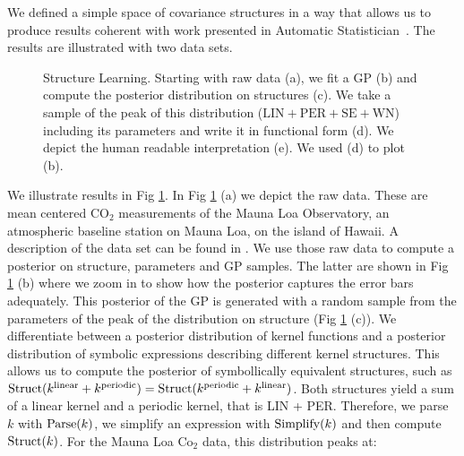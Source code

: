\newpage
We defined a simple space of covariance structures in a way that allows us to produce results coherent with 
work presented in Automatic Statistician~\citep{duvenaud2013structure,lloyd2014automatic}. The results are illustrated with two data sets.

\begin{figure}
\centering

\caption{\footnotesize Structure Learning. Starting with raw data (a), we fit a \ac{GP}
(b) and compute the posterior distribution on structures (c). We take a sample
of the peak of this distribution ($\text{LIN}+\text{PER}+\text{SE}+\text{WN}$)
including its parameters and write it in functional form (d). We depict the
human readable interpretation (e). We used (d) to plot (b).}\label{fig:posterior}
\end{figure}
We illustrate results in Fig \ref{fig:posterior}. In Fig \ref{fig:posterior} (a) we depict the raw data. 
These are mean centered CO$_2$ measurements of the Mauna Loa Observatory, an atmospheric
baseline station on Mauna Loa, on the island of Hawaii. 
A description of the data set  can be found in  \citealp[][chapter 5]{rasmussen2006gaussian}.  
We use those raw data to compute a posterior on structure, parameters and \ac{GP}
samples.
The latter are shown in  Fig \ref{fig:posterior} (b)
where we zoom in to show how the posterior captures the error bars
adequately.
This posterior of the \ac{GP} is generated with a random sample from the parameters
of the peak of the distribution on structure (Fig \ref{fig:posterior} (c)).
We differentiate between a posterior distribution of kernel functions and  a
posterior distribution of
symbolic expressions describing different kernel structures. 
This allows us to compute the posterior of symbollically equivalent structures,
such as $\text{Struct}(k^\text{linear} + k^\text{periodic})=\text{Struct}(k^\text{periodic} + k^\text{linear})$. Both structures yield
a sum of a linear kernel and a periodic kernel, that is LIN + PER.
Therefore, we parse $k$ with $\text{Parse}(k)$, we simplify an expression with $\text{Simplify}(k)$ and
then compute $\text{Struct}(k)$.
For the Mauna Loa Co$_2$ data, this distribution peaks at:
